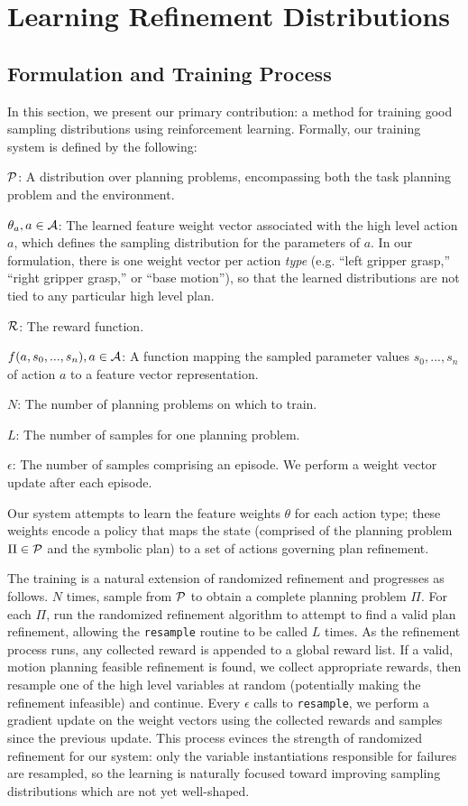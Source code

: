 \section{Learning Refinement Distributions}
\subsection{Formulation and Training Process}
In this section, we present our primary contribution: a method
for training good sampling distributions using reinforcement learning.
Formally, our training system is defined by the following:
\begin{tightlist}
\item[$\mathcal{P}$:] A distribution over planning problems, encompassing both
the task planning problem and the environment.
\item[$\theta_{a}, a \in \mathcal{A}$:] The learned feature weight vector associated with the high
level action $a$, which defines the sampling distribution for the
parameters of $a$. In our formulation, there is one
weight vector per action \emph{type} (e.g. ``left gripper grasp,'' ``right
gripper grasp,'' or ``base motion''), so that the learned distributions are
not tied to any particular high level plan.
\item[$\mathcal{R}$:] The reward function.
\item[$f(a, s_{0}, ..., s_{n}), a \in \mathcal{A}$:] A function mapping the sampled
parameter values $s_{0}, ..., s_{n}$ of action $a$ to a feature vector representation.
\item[$N$:] The number of planning problems on which to train.
\item[$L$:] The number of samples for one planning problem.
\item[$\epsilon$:] The number of samples comprising an episode. We perform
a weight vector update after each episode.
\end{tightlist}

Our system attempts to learn the feature weights $\theta$ for each action type; these weights
encode a policy that maps the state (comprised of the planning problem $\Pi \in \mathcal{P}$
and the symbolic plan) to a set of actions governing plan refinement.

The training is a natural extension of randomized
refinement and progresses as follows. $N$ times, sample from $\mathcal{P}$ to obtain
a complete planning problem $\Pi$. For each $\Pi$, run the randomized refinement
algorithm to attempt to find a valid plan refinement, allowing the \texttt{resample}
routine to be called $L$ times. As the refinement process runs, any collected
reward is appended to a global reward list. If a valid, motion planning
feasible refinement is found, we collect appropriate rewards, then resample one of
the high level variables at random (potentially making the refinement infeasible)
and continue. Every $\epsilon$ calls to
\texttt{resample}, we perform a gradient update on the weight vectors using the
collected rewards and samples since the previous update. This process
evinces the strength of randomized refinement for our system: only the variable
instantiations responsible for failures are resampled, so the learning is naturally
focused toward improving sampling distributions which are not yet well-shaped.


